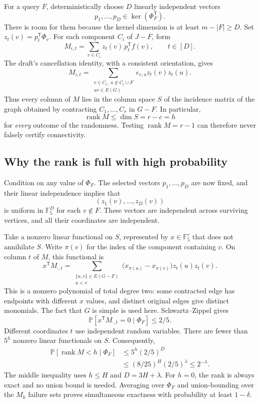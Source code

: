 \documentclass[11pt]{article}
\theoremstyle{remark}\newtheorem{remark}[theorem]{Remark}
\newcommand{\F}{\mathbb F}
\newcommand{\Prb}{\mathbb P}
\newcommand{\rank}{\operatorname{rank}}
\begin{document}
For a query $F$, deterministically choose $D$ linearly independent vectors
\[
 p_1,\ldots,p_D\in\ker(\Phi_F^{\mathsf T}).
\]
There is room for them because the kernel dimension is at least $m-|F|\ge D$. Set $z_t(v)=p_t^{\mathsf T}\Phi_v$. For each component $C_i$ of $J-F$, form
\[
 M_{i,t}=\sum_{v\in C_i}z_t(v)\,p_t^{\mathsf T}f(v),\qquad t\in[D].
\]
The draft's cancellation identity, with a consistent orientation, gives
\begin{equation}\label{eq:constant-transform}
 M_{i,t}=\sum_{\substack{v\in C_i,\ u\notin C_i\cup F\\uv\in E(G)}}
 \epsilon_{v,u}z_t(v)z_t(u).
\end{equation}
Thus every column of $M$ lies in the column space $S$ of the incidence matrix of the graph obtained by contracting $C_1,\ldots,C_r$ in $G-F$. In particular,
\[
 \rank M\le\dim S=r-c=h
\]
for \emph{every} outcome of the randomness. Testing $\rank M=r-1$ can therefore never falsely certify connectivity.

\subsection{Why the rank is full with high probability}
Condition on any value of $\Phi_F$. The selected vectors $p_1,\ldots,p_D$ are now fixed, and their linear independence implies that
\[
 (z_1(v),\ldots,z_D(v))
\]
is uniform in $\F_5^D$ for each $v\notin F$. These vectors are independent across surviving vertices, and all their coordinates are independent.

Take a nonzero linear functional on $S$, represented by $x\in\F_5^r$ that does not annihilate $S$. Write $\pi(v)$ for the index of the component containing $v$. On column $t$ of $M$, this functional is
\begin{equation}\label{eq:cut-poly}
 x^{\mathsf T}M_{\cdot,t}=
 \sum_{\substack{\{u,v\}\in E(G-F)\\u<v}}
 \bigl(x_{\pi(u)}-x_{\pi(v)}\bigr)z_t(u)z_t(v).
\end{equation}
This is a nonzero polynomial of total degree two: some contracted edge has endpoints with different $x$ values, and distinct original edges give distinct monomials. The fact that $G$ is simple is used here. Schwartz--Zippel gives
\[
 \Prb[x^{\mathsf T}M_{\cdot,t}=0\mid\Phi_F]\le 2/5.
\]
Different coordinates $t$ use independent random variables. There are fewer than $5^h$ nonzero linear functionals on $S$. Consequently,
\begin{align*}
 \Prb[\rank M<h\mid\Phi_F]
 &\le 5^h(2/5)^D\\
 &\le (8/25)^H(2/5)^\lambda
 \le 2^{-\lambda}.
\end{align*}
The middle inequality uses $h\le H$ and $D=3H+\lambda$. For $h=0$, the rank is always exact and no union bound is needed. Averaging over $\Phi_F$ and union-bounding over the $M_k$ failure sets proves simultaneous exactness with probability at least $1-\delta$.
\end{document}
